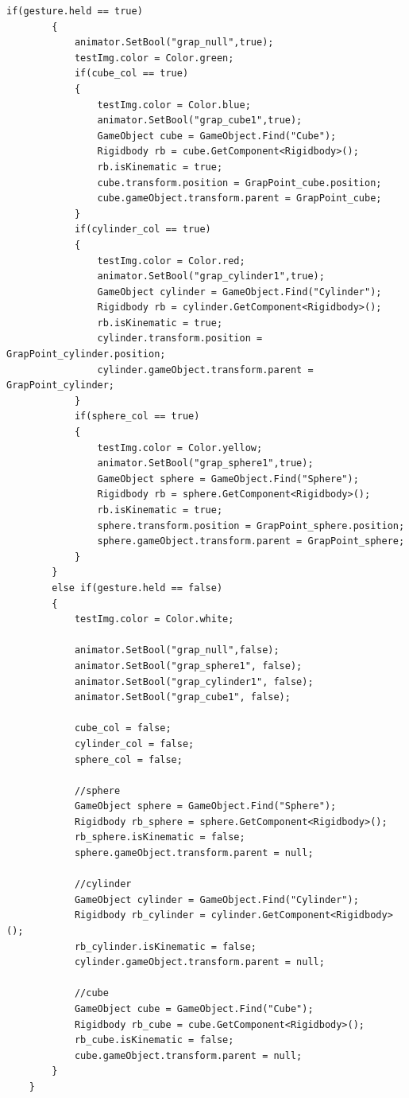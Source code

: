 \documentclass{ltjsreport}
\begin{document}
\begin{lstlisting}[caption = CalibrationManager, label = code:Calibration]
        if(gesture.held == true)
        {
            animator.SetBool("grap_null",true);
            testImg.color = Color.green;
            if(cube_col == true)
            {
                testImg.color = Color.blue;
                animator.SetBool("grap_cube1",true);
				GameObject cube = GameObject.Find("Cube");
				Rigidbody rb = cube.GetComponent<Rigidbody>();
				rb.isKinematic = true;
				cube.transform.position = GrapPoint_cube.position;
				cube.gameObject.transform.parent = GrapPoint_cube;
            }
            if(cylinder_col == true)
            {
                testImg.color = Color.red;
                animator.SetBool("grap_cylinder1",true);
				GameObject cylinder = GameObject.Find("Cylinder");
				Rigidbody rb = cylinder.GetComponent<Rigidbody>();
				rb.isKinematic = true;
				cylinder.transform.position = GrapPoint_cylinder.position;
				cylinder.gameObject.transform.parent = GrapPoint_cylinder;
            }
            if(sphere_col == true)
            {
                testImg.color = Color.yellow;
                animator.SetBool("grap_sphere1",true);
				GameObject sphere = GameObject.Find("Sphere");
				Rigidbody rb = sphere.GetComponent<Rigidbody>();
				rb.isKinematic = true;
				sphere.transform.position = GrapPoint_sphere.position;
				sphere.gameObject.transform.parent = GrapPoint_sphere;
            }
        }
        else if(gesture.held == false)
        {
            testImg.color = Color.white;

            animator.SetBool("grap_null",false);
            animator.SetBool("grap_sphere1", false);
            animator.SetBool("grap_cylinder1", false);
            animator.SetBool("grap_cube1", false);

            cube_col = false;
            cylinder_col = false;
            sphere_col = false;

            //sphere
            GameObject sphere = GameObject.Find("Sphere");
            Rigidbody rb_sphere = sphere.GetComponent<Rigidbody>();
            rb_sphere.isKinematic = false;
            sphere.gameObject.transform.parent = null;

            //cylinder
            GameObject cylinder = GameObject.Find("Cylinder");
            Rigidbody rb_cylinder = cylinder.GetComponent<Rigidbody>();
            rb_cylinder.isKinematic = false;
            cylinder.gameObject.transform.parent = null;

            //cube
            GameObject cube = GameObject.Find("Cube");
            Rigidbody rb_cube = cube.GetComponent<Rigidbody>();
            rb_cube.isKinematic = false;
            cube.gameObject.transform.parent = null;
        }
    }


\end{lstlisting}
\end{document}
